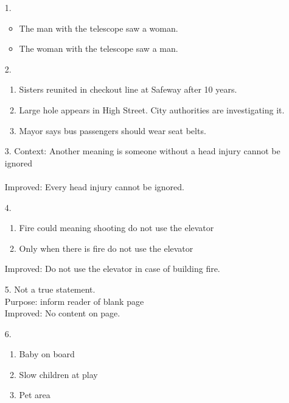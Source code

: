 \documentclass[11pt]{exam}
\author{@dantevangelista}
\begin{document}

\begin{enumerate}[leftmargin=0pt]

\item[1.] 
\begin{itemize}
    \item The man with the telescope saw a woman.
    \item The woman with the telescope saw a man.
\end{itemize}

\item[2.]
\begin{enumerate}[label=(\alph*)]
    \item Sisters reunited in checkout line at Safeway after 10 years.
    \item Large hole appears in High Street. City authorities are investigating it.
    \item Mayor says bus passengers should wear seat belts.
\end{enumerate}

\item[3.] Context: Another meaning is someone without a head injury cannot be ignored \\
\\
Improved: Every head injury cannot be ignored.

\item[4.]
\begin{enumerate}[label=(\alph*)]
    \item Fire could meaning shooting do not use the elevator
    \item Only when there is fire do not use the elevator
\end{enumerate}
Improved: Do not use the elevator in case of building fire.

\item[5.] Not a true statement. \\
Purpose: inform reader of blank page \\
Improved: No content on page.

\item[6.] 
\begin{enumerate}[label=(\alph*)]
    \item Baby on board 
    \item Slow children at play
    \item Pet area
\end{enumerate}


\end{enumerate}
\end{document}
